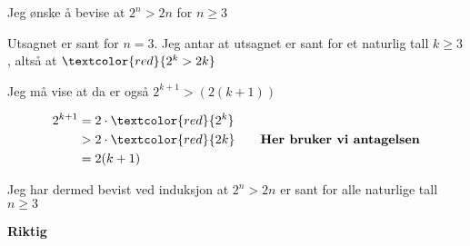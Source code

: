 \documentclass{article}
\begin{document}
Jeg ønske å bevise at $2^n > 2n$ for $n \ge 3$

Utsagnet er sant for $n=3$. Jeg antar at utsagnet er sant for et naturlig tall $k \ge 3$, altså at $\textcolor{red}{2^k > 2k}$

Jeg må vise at da er også $2^{k+1} > (2(k+1))$

\begin{align*}
2^{k+1} &= 2 \cdot \textcolor{red}{2^k} \\
&> 2 \cdot \textcolor{red}{2k} \qquad \textbf{Her bruker vi antagelsen} \\
&= 2(k+1)
\end{align*}

Jeg har dermed bevist ved induksjon at $2^n > 2n$ er sant for alle naturlige tall $n \ge 3$

\textbf{Riktig}



\end{document}
